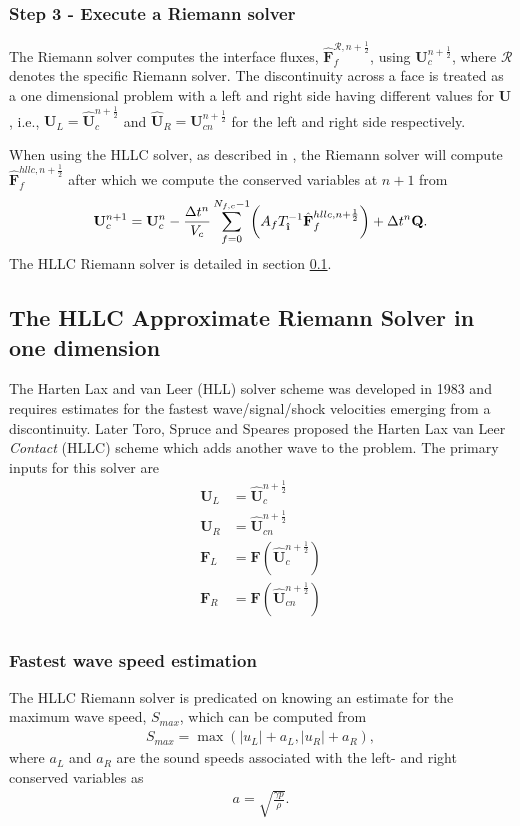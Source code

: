 \documentclass[10pt,letterpaper,notitlepage]{article}
\numberwithin{equation}{section}
\newcommand{\uvec}[1]{\boldsymbol{\hat{\textbf{#1}}}}
\newcommand{\ihat}{\uvec{\i}}
\newcommand{\hatbf}[1]{\hat{\mathbf{#1}}}
\newcommand{\beqn}{\begin{equation}\begin{aligned}}
\newcommand{\eeqn}{\end{aligned}\end{equation}}
\begin{document}
\subsubsection{Step 3 - Execute a Riemann solver}
The Riemann solver computes the interface fluxes, $\hatbf{F}_f^{\mathcal{R},n{+}\frac{1}{2}}$, using $\mathbf{U}_c^{n{+}\frac{1}{2}}$, where $\mathcal{R}$ denotes the specific Riemann solver. The discontinuity across a face is treated as a one dimensional problem with a left and right side having different values for $\mathbf{U}$, i.e., $\mathbf{U}_L = \hatbf{U}_c^{n{+}\frac{1}{2}}$ and $\hatbf{U}_R = \mathbf{U}_{cn}^{n{+}\frac{1}{2}}$ for the left and right side respectively.


When using the HLLC solver, as described in \cite{Toro}, the Riemann solver will compute $\hatbf{F}_f^{hllc,n{+}\frac{1}{2}}$ after which we compute the conserved variables at $n+1$ from
\beqn 
\mathbf{U}_c^{n+1} = \mathbf{U}_c^n - \frac{\Delta t^n}{V_c} \sum_{f=0}^{N_{f,c}{-1}} 
\biggr(
A_f T_{\ihat}^{-1}
\hatbf{F}_f^{hllc,n{+}\frac{1}{2}}
\biggr)
+ \Delta t^n \mathbf{Q}.
\eeqn 
The HLLC Riemann solver is detailed in section \ref{section:HLLC}.

\newpage 
\subsection{The HLLC Approximate Riemann Solver in one dimension} \label{section:HLLC}
The Harten Lax and van Leer (HLL) solver scheme was developed in 1983 \cite{Toro} and requires estimates for the fastest wave/signal/shock velocities emerging from a discontinuity. Later Toro, Spruce and Speares proposed the Harten Lax van Leer \textit{Contact} (HLLC) scheme \cite{Toro} which adds another wave to the problem.
\newline
\newline
The primary inputs for this solver are
\beqn 
\mathbf{U}_L &= \hatbf{U}_c^{n{+}\frac{1}{2}} \\
\mathbf{U}_R &= \hatbf{U}_{cn}^{n{+}\frac{1}{2}} \\
\mathbf{F}_L &= \mathbf{F}(\hatbf{U}_{c}^{n{+}\frac{1}{2}}) \\
\mathbf{F}_R &= \mathbf{F}(\hatbf{U}_{cn}^{n{+}\frac{1}{2}}) \\
\eeqn 


\subsubsection{Fastest wave speed estimation}
The HLLC Riemann solver is predicated on knowing an estimate for the maximum wave speed, $S_{max}$, which can be computed from 
\beqn
S_{max} =\max (|{u}_L| + a_L, |{u}_R| + a_R),
\eeqn
where $a_L$ and $a_R$ are the sound speeds associated with the left- and right conserved variables as
\beqn 
a = \sqrt{\frac{\gamma p}{\rho}}.
\eeqn 
\end{document}
